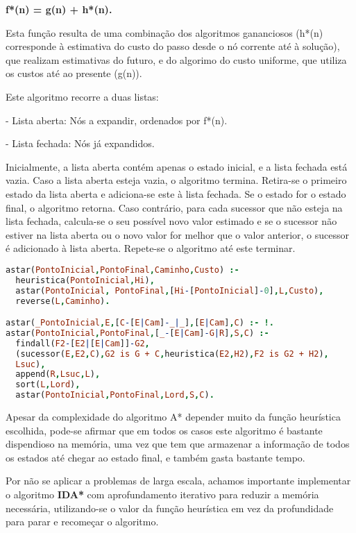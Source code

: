 \documentclass[a4paper]{article}
\begin{document}
\centerline{\textbf{f*(n) = g(n) + h*(n).}}

Esta função resulta de uma combinação dos algoritmos gananciosos (h*(n) corresponde à estimativa do custo do passo desde o nó corrente até à solução), que realizam estimativas do futuro, e do algorimo do custo uniforme, que utiliza os custos até ao presente (g(n)).

Este algoritmo recorre a duas listas:

- Lista aberta: Nós a expandir, ordenados por f*(n).

- Lista fechada: Nós já expandidos.

Inicialmente, a lista aberta contém apenas o estado inicial, e a lista fechada está vazia. Caso a lista aberta esteja vazia, o algoritmo termina. Retira-se o primeiro estado da lista aberta e adiciona-se este à lista fechada. Se o estado for o estado final, o algoritmo retorna. Caso contrário, para cada sucessor que não esteja na lista fechada, calcula-se o seu possível novo valor estimado e se o sucessor não estiver na lista aberta ou o novo valor for melhor que o valor anterior, o sucessor é adicionado à lista aberta. Repete-se o algoritmo até este terminar.

\begin{lstlisting}[language=Prolog]
astar(PontoInicial,PontoFinal,Caminho,Custo) :-
  heuristica(PontoInicial,Hi),
  astar(PontoInicial, PontoFinal,[Hi-[PontoInicial]-0],L,Custo),
  reverse(L,Caminho).

astar(_PontoInicial,E,[C-[E|Cam]-_|_],[E|Cam],C) :- !.
astar(PontoInicial,PontoFinal,[_-[E|Cam]-G|R],S,C) :-
  findall(F2-[E2|[E|Cam]]-G2,
  (sucessor(E,E2,C),G2 is G + C,heuristica(E2,H2),F2 is G2 + H2),
  Lsuc),
  append(R,Lsuc,L),
  sort(L,Lord),
  astar(PontoInicial,PontoFinal,Lord,S,C).
\end{lstlisting}

Apesar da complexidade do algoritmo A* depender muito da função heurística escolhida, pode-se afirmar que em todos os casos este algoritmo é bastante dispendioso na memória, uma vez que tem que armazenar a informação de todos os estados até chegar ao estado final, e também gasta bastante tempo.

Por não se aplicar a problemas de larga escala, achamos importante implementar o algoritmo \textbf{IDA*} com aprofundamento iterativo para reduzir a memória necessária, utilizando-se o valor da função heurística em vez da profundidade para parar e recomeçar o algoritmo.
\end{document}
